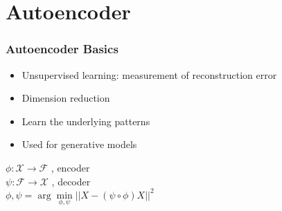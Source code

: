 \documentclass{beamer}
\begin{document}
\section{Autoencoder}
\begin{frame}
    \frametitle{Autoencoder Basics}
    \begin{itemize}
        \item Unsupervised learning: measurement of reconstruction error
        \item Dimension reduction
        \item Learn the underlying patterns
        \item Used for generative models
\end{itemize}
\begin{center}
    $ \phi : \mathcal{X} \rightarrow \mathcal{F}$ , encoder \\
    $ \psi : \mathcal{F} \rightarrow \mathcal{X}$ , decoder \\
    $ \phi,\psi = \arg \min\limits_{\phi,\psi} || X-(\psi \circ \phi)X||^2$
\end{center}
\begin{center}
    
\end{center}

\end{frame}

\end{document}
